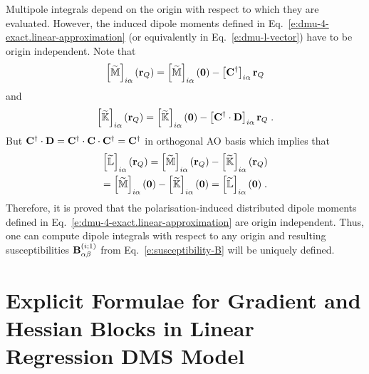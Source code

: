 \documentclass[aip,amsmath,amssymb,reprint,floatfix]{revtex4-1}
\begin{document}
Multipole integrals depend on the origin with respect to which they are evaluated.
However, the induced dipole moments defined in Eq.~\eqref{e:dmu-4-exact.linear-approximation} 
(or equivalently in Eq.~\eqref{e:dmu-l-vector})
have to be origin independent. Note that
%
\begin{equation}
 \left[ \widetilde{\mathbb{M}} \right]_{i\alpha} ({\bf r}_Q) 
 = \left[ \widetilde{\mathbb{M}} \right]_{i\alpha} ({\bf 0}) - \left[ {\bf C}^\dagger \right]_{i\alpha} {\bf r}_Q  
\end{equation}
%
and
%
\begin{equation}
 \left[ \widetilde{\mathbb{K}} \right]_{i\alpha} ({\bf r}_Q) 
 = \left[ \widetilde{\mathbb{K}} \right]_{i\alpha} ({\bf 0}) - \left[ {\bf C}^\dagger \cdot {\bf D} \right]_{i\alpha} {\bf r}_Q \;.
\end{equation}
%
But ${\bf C}^\dagger \cdot {\bf D}={\bf C}^\dagger \cdot {\bf C} \cdot {\bf C}^\dagger={\bf C}^\dagger$ in orthogonal
AO basis which implies that
%
\begin{multline}
   \left[ \widetilde{\mathbb{L}} \right]_{i\alpha} ({\bf r}_Q) 
 = \left[ \widetilde{\mathbb{M}} \right]_{i\alpha} ({\bf r}_Q) 
 - \left[ \widetilde{\mathbb{K}} \right]_{i\alpha} ({\bf r}_Q) \\
 = \left[ \widetilde{\mathbb{M}} \right]_{i\alpha} ({\bf 0})   
 - \left[ \widetilde{\mathbb{K}} \right]_{i\alpha} ({\bf 0})
 = \left[ \widetilde{\mathbb{L}} \right]_{i\alpha} ({\bf 0}) \;.
\end{multline}
%
Therefore, it is proved that the polarisation\hyp{}induced distributed dipole moments 
defined in Eq.~\eqref{e:dmu-4-exact.linear-approximation} are origin independent.
Thus, one can compute dipole integrals with respect to any origin and resulting
susceptibilities ${\bf B}_{\alpha\beta}^{(i;1)}$ from Eq.~\eqref{e:susceptibility-B} will be uniquely defined.

\section{\label{a:blocks} Explicit Formulae for Gradient and Hessian Blocks in Linear Regression DMS Model}
\end{document}
